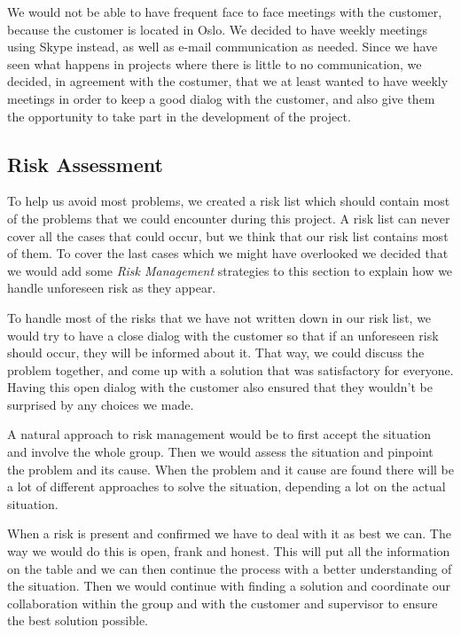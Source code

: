     We would not be able to have frequent face to face meetings with the customer, because the customer is located in Oslo. We decided to have weekly meetings using Skype instead, as well as e-mail communication as needed. Since we have seen what happens in projects where there is little to no communication, we decided, in agreement with the costumer, that we at least wanted to have weekly meetings in order to keep a good dialog with the customer, and also give them the opportunity to take part in the development of the project. 
    
    
    \subsection{Risk Assessment}\label{Risk Assessment}
     To help us avoid most problems, we created a risk list which should contain most of the problems that we could encounter during this project. A risk list can never cover all the cases that could occur, but we think that our risk list contains most of them. To cover the last cases which we might have overlooked we decided that we would add some \textit{Risk Management} strategies to this section to explain how we handle unforeseen risk as they appear. 
     
     To handle most of the risks that we have not written down in our risk list, we would try to have a close dialog with the customer so that if an unforeseen risk should occur, they will be informed about it. That way, we could discuss the problem together, and come up with a solution that was satisfactory for everyone. Having this open dialog with the customer also ensured that they wouldn't be surprised by any choices we made.
     
    A natural approach to risk management would be to first accept the situation and involve the whole group. Then we would assess the situation and pinpoint the problem and its cause. When the problem and it cause are found there will be a lot of different approaches to solve the situation, depending a lot on the actual situation. 
    
    When a risk is present and confirmed we have to deal with it as best we can. The way we would do this is open, frank and honest. This will put all the information on the table and we can then continue the process with a better understanding of the situation. Then we would continue with finding a solution and coordinate our collaboration within the group and with the customer and supervisor to ensure the best solution possible.

